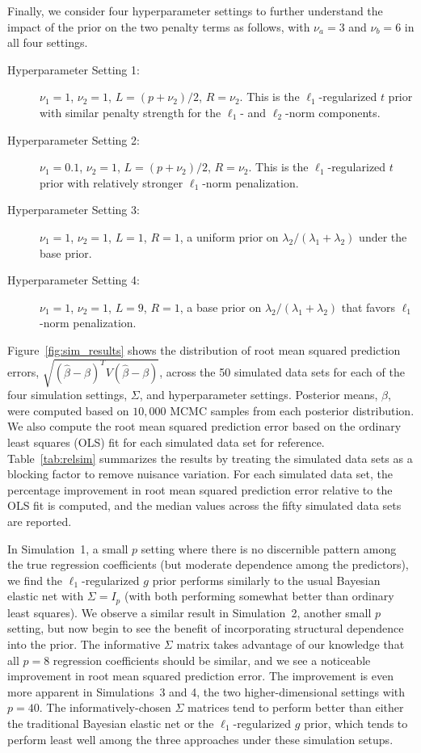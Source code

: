 \documentclass[12pt]{article}
\begin{document}
Finally, we consider four hyperparameter settings to further understand the impact of the prior
on the two penalty terms as follows, with $\nu_a = 3$ and $\nu_b = 6$ in all four settings.
\begin{description}
\item[Hyperparameter Setting 1:] $\nu_1 = 1$, $\nu_2 = 1$, $L = (p + \nu_2)/2$, $R = \nu_2$. 
This is the $\ell_1$-regularized $t$ prior with similar penalty strength for the $\ell_1$- and 
$\ell_2$-norm components.
\item[Hyperparameter Setting 2:] $\nu_1 = 0.1$, $\nu_2 = 1$, $L = (p + \nu_2)/2$, $R = \nu_2$. 
This is the $\ell_1$-regularized $t$ prior with relatively stronger $\ell_1$-norm penalization.
\item[Hyperparameter Setting 3:] $\nu_1 = 1$, $\nu_2 = 1$, $L = 1$, $R = 1$, a uniform prior on
$\lambda_2/(\lambda_1 + \lambda_2)$ under the base prior.
\item[Hyperparameter Setting 4:] $\nu_1 = 1$, $\nu_2 = 1$, $L = 9$, $R = 1$, a base prior on
$\lambda_2/(\lambda_1 + \lambda_2)$ that favors $\ell_1$-norm penalization.
\end{description}

Figure~\ref{fig:sim_results} shows the distribution of root mean squared prediction errors, 
$\sqrt{(\hat{\beta} - \beta)^T V (\hat{\beta} - \beta)}$, across the 50 simulated data sets
for each of the four simulation settings, $\Sigma$, and hyperparameter settings. Posterior 
means, $\hat{\beta}$, were computed based on $10,000$ MCMC samples from each posterior 
distribution. We also compute the root mean squared prediction error based on the ordinary 
least squares (OLS) fit for each simulated data set for reference.
Table~\ref{tab:relsim} summarizes the results by treating the simulated data sets as a 
blocking factor to remove nuisance variation. For each simulated data set, the percentage 
improvement in root mean squared prediction error relative to the OLS fit is computed,
and the median values across the fifty simulated data sets are reported.

In Simulation~1, a small $p$ setting where there is no discernible pattern among the true 
regression coefficients (but moderate dependence among the predictors), we find the
$\ell_1$-regularized $g$ prior performs similarly to the usual Bayesian elastic net
with $\Sigma = I_p$ (with both performing somewhat better than ordinary least squares).
We observe a similar result in Simulation~2, another small $p$ setting, but now
begin to see the benefit of incorporating structural dependence into the prior.
The informative $\Sigma$ matrix takes advantage of our knowledge that all $p=8$ 
regression coefficients should be similar, and we see a noticeable improvement in root
mean squared prediction error. The improvement is even more apparent in Simulations~3
and 4, the two higher-dimensional settings with $p=40$. The informatively-chosen
$\Sigma$ matrices tend to perform better than either the traditional Bayesian
elastic net or the $\ell_1$-regularized $g$ prior, which tends to perform least
well among the three approaches under these simulation setups.
\end{document}
